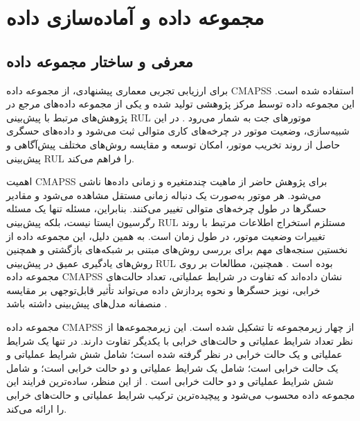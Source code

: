 
\section{مجموعه داده  و آماده‌سازی داده}
\label{sec:dataset}

\subsection{معرفی و ساختار مجموعه داده}
\label{sec:dataset-intro}

برای ارزیابی تجربی معماری پیشنهادی، از مجموعه داده
\gls{CMAPSS} استفاده شده است. این مجموعه داده توسط مرکز پژوهشی
تولید شده و یکی از مجموعه داده‌های مرجع در پژوهش‌های مرتبط با
پیش‌بینی \gls{RUL} موتورهای جت به شمار
می‌رود \cite{NASA2007C-MAPSS}.
در این شبیه‌سازی، وضعیت موتور در چرخه‌های کاری متوالی ثبت می‌شود و
داده‌های حسگری حاصل از روند تخریب موتور، امکان توسعه و مقایسه
روش‌های مختلف پیش‌آگاهی و پیش‌بینی \gls{RUL} را فراهم می‌کند.

اهمیت \gls{CMAPSS} برای پژوهش حاضر از ماهیت چندمتغیره و زمانی داده‌ها
ناشی می‌شود. هر موتور به‌صورت یک دنباله زمانی مستقل مشاهده می‌شود و
مقادیر حسگرها در طول چرخه‌های متوالی تغییر می‌کنند. بنابراین، مسئله
تنها یک مسئله رگرسیون ایستا نیست، بلکه پیش‌بینی \gls{RUL} مستلزم
استخراج اطلاعات مرتبط با روند تغییرات وضعیت موتور، در طول زمان است.
به همین دلیل، این مجموعه داده از نخستین سنجه‌های مهم برای بررسی
روش‌های مبتنی بر شبکه‌های بازگشتی و همچنین روش‌های یادگیری عمیق در
پیش‌بینی \gls{RUL} بوده است \cite{heimes2008recurrent}.
همچنین، مطالعات بر روی مجموعه داده CMAPSS نشان داده‌اند که
تفاوت در شرایط عملیاتی، تعداد حالت‌های خرابی، نویز حسگرها و نحوه
پردازش داده می‌تواند تأثیر قابل‌توجهی بر مقایسه منصفانه مدل‌های
پیش‌بینی داشته باشد \cite{NASA2007C-MAPSS}.

مجموعه داده \gls{CMAPSS} از چهار زیرمجموعه
 تا  تشکیل شده است. این زیرمجموعه‌ها از نظر
تعداد شرایط عملیاتی و حالت‌های خرابی با یکدیگر تفاوت دارند. در
 تنها یک شرایط عملیاتی و یک حالت خرابی در نظر گرفته شده
است؛  شامل شش شرایط عملیاتی و یک حالت خرابی است؛
 شامل یک شرایط عملیاتی و دو حالت خرابی است؛ و
 شامل شش شرایط عملیاتی و دو حالت خرابی است
\cite{NASA2007C-MAPSS}. از این منظر،
 ساده‌ترین فرایند این مجموعه داده محسوب می‌شود و
 پیچیده‌ترین ترکیب شرایط عملیاتی و حالت‌های خرابی را
ارائه می‌کند.

